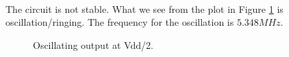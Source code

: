 \documentclass[a4paper,english,11pt]{article}
\begin{document}
\\
The circuit is not stable. What we see from the plot in Figure \ref{fig:oscil:out} is oscillation/ringing. The frequency for the oscillation is
$5.348 MHz$.
\begin{figure}[!htbp]
 \centering
  \caption{Oscillating output at Vdd/2.}
  \label{fig:oscil:out}	
\end{figure}
\end{document}
